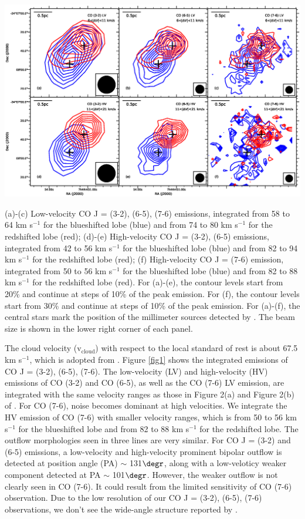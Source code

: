 \includegraphics[scale=.60]{./fig/ori_contour.eps}
\caption{(a)-(c) Low-velocity CO J = (3-2), (6-5), (7-6) emissions, integrated from 58 to 64 km s$^{-1} $ for the blueshifted lobe (blue) and from 74 to 80 km s$^{-1}$ for the redshifted lobe (red); (d)-(e) High-velocity CO J = (3-2), (6-5) emissions, integrated from 42 to 56 km s$^{-1} $ for the blueshifted lobe (blue) and from 82 to 94 km s$^{-1}$ for the redshifted lobe (red); (f) High-velocity CO J = (7-6) emission, integrated from 50 to 56 km s$^{-1} $ for the blueshifted lobe (blue) and from 82 to 88 km s$^{-1}$ for the redshifted lobe (red). For (a)-(e), the contour levels start from 20\% and continue at steps of 10\% of the peak emission. For (f), the contour levels start from 30\% and continue at steps of 10\% of the peak emission. For (a)-(f), the central stars mark the position of the millimeter sources detected by \citet{2009ApJ...696...66Q}. The beam size is shown in the lower right corner of each panel.  \label{fig1}}

The cloud velocity (v$_{\mathrm{cloud}}$) with respect to the local standard of rest is about 67.5 km s$^{-1}$, which is adopted from \citet{2003A&A...412..175K}. Figure \ref{fig1} shows the integrated emissions of CO J = (3-2), (6-5), (7-6). The low-velocity (LV) and high-velocity (HV) emissions of CO (3-2) and CO (6-5), as well as the CO (7-6) LV emission, are integrated with the same velocity ranges as those in Figure 2(a) and Figure 2(b) of \citet{2009ApJ...696...66Q}. For CO (7-6), noise becomes dominant at high velocities. We integrate the HV emission of CO (7-6) with smaller velocity ranges, which is from 50 to 56 km s$^{-1} $ for the blueshifted lobe and from 82 to 88 km s$^{-1}$ for the redshifted lobe. The outflow morphologies seen in three lines are very similar. For CO J = (3-2) and (6-5) emissions, a low-velocity and high-velocity prominent bipolar outflow is detected at position angle (PA) $\sim$ 131${\degr}$, along with a low-veloticy weaker component detected at PA $\sim$ 101${\degr}$. However, the weaker outflow is not clearly seen in CO (7-6). It could result from the limited sensitivity of CO (7-6) observation. Due to the low resolution of our CO J = (3-2), (6-5), (7-6) observations, we don't see the wide-angle structure reported by \citet{2009ApJ...696...66Q}.



